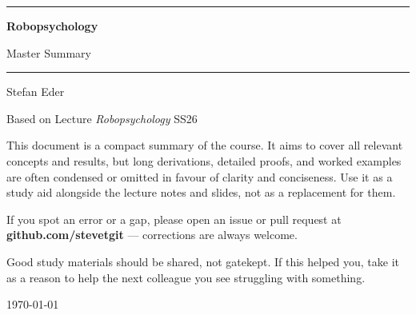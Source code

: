 \documentclass[11pt, oneside]{book}
\newcommand{\coursetitle}{Robopsychology}
\newcommand{\documenttype}{Master Summary}
\newcommand{\authorname}{Stefan Eder}
\newcommand{\basedon}{Based on Lecture \emph{Robopsychology} SS26}
\begin{document}
\frontmatter  %


\thispagestyle{empty}
\vspace*{1.8cm}

\begin{center}
  {\color{accent}\rule{\linewidth}{1.8pt}}
  \vspace{0.65cm}

  {\fontsize{28}{34}\selectfont\bfseries\color{accent}\coursetitle\par}
  \vspace{0.25cm}
  {\large\color{gray!80!black}\documenttype\par}

  \vspace{0.55cm}
  {\color{accent!35}\rule{\linewidth}{0.5pt}}
  \vspace{0.55cm}

  {\large\authorname\par}
  \vspace{0.2cm}
  {\small\color{gray!70}\basedon\par}
\end{center}

\vspace{1.6cm}

\begin{center}
\begin{minipage}{0.84\textwidth}
  \small\color{gray!80!black}
  This document is a compact summary of the course.
  It aims to cover all relevant concepts and results, but long derivations,
  detailed proofs, and worked examples are often condensed or omitted in
  favour of clarity and conciseness.
  Use it as a study aid alongside the lecture notes and slides, not as a
  replacement for them.

  \medskip
  If you spot an error or a gap, please open an issue or pull request at
  \textbf{github.com/stevetgit} --- corrections are always welcome.

  \medskip
  \color{gray!60!black}
  Good study materials should be shared, not gatekept.
  If this helped you, take it as a reason to help the next colleague you see struggling with something.
\end{minipage}
\end{center}

\vfill
{\centering\small\color{gray!65} \today\par}
\clearpage
\end{document}
